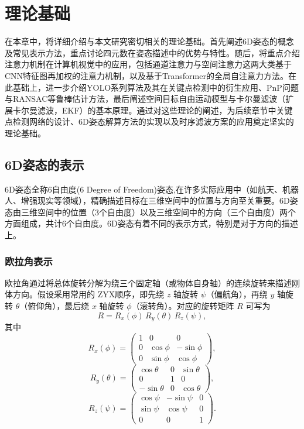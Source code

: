 \chapter{理论基础}
\label{chap:theory}

在本章中，将详细介绍与本文研究密切相关的理论基础。首先阐述6D姿态的概念及常见表示方法，重点讨论四元数在姿态描述中的优势与特性。随后，将重点介绍注意力机制在计算机视觉中的应用，包括通道注意力与空间注意力这两大类基于CNN特征图再加权的注意力机制，以及基于Transformer的全局自注意力方法。在此基础上，进一步介绍YOLO系列算法及其在关键点检测中的衍生应用、PnP问题与RANSAC等鲁棒估计方法，最后阐述空间目标自由运动模型与卡尔曼滤波（扩展卡尔曼滤波，EKF）的基本原理。通过对这些理论的阐述，为后续章节中关键点检测网络的设计、6D姿态解算方法的实现以及时序滤波方案的应用奠定坚实的理论基础。

\section{6D姿态的表示}

6D姿态全称6自由度(6 Degree of Freedom)姿态,在许多实际应用中（如航天、机器人、增强现实等领域）\cite{Zuo_2024_CVPR,aerospace11070526,NGUYEN2024103459,choi2025robust}，精确描述目标在三维空间中的位置与方向至关重要。6D姿态由三维空间中的位置（3个自由度）以及三维空间中的方向（三个自由度）两个方面组成，共计6个自由度。6D姿态有着不同的表示方式，特别是对于方向的描述上。

\subsection{欧拉角表示}
欧拉角通过将总体旋转分解为绕三个固定轴（或物体自身轴）的连续旋转来描述刚体方向。假设采用常用的 ZYX顺序，即先绕 $z$ 轴旋转 $\psi$（偏航角），再绕 $y$ 轴旋转 $\theta$（俯仰角），最后绕 $x$ 轴旋转 $\phi$（滚转角）。对应的旋转矩阵 $R$ 可写为
\begin{equation}
	R = R_x(\phi) \, R_y(\theta) \, R_z(\psi),
\end{equation}
其中
\begin{equation}
	R_x(\phi) = \begin{pmatrix}
		1 & 0 & 0 \\
		0 & \cos\phi & -\sin\phi \\
		0 & \sin\phi & \cos\phi
	\end{pmatrix},
\end{equation}
\begin{equation}
	R_y(\theta) = \begin{pmatrix}
		\cos\theta & 0 & \sin\theta \\
		0 & 1 & 0 \\
		-\sin\theta & 0 & \cos\theta
	\end{pmatrix},
\end{equation}
\begin{equation}
	R_z(\psi) = \begin{pmatrix}
		\cos\psi & -\sin\psi & 0 \\
		\sin\psi & \cos\psi & 0 \\
		0 & 0 & 1
	\end{pmatrix}.
\end{equation}

